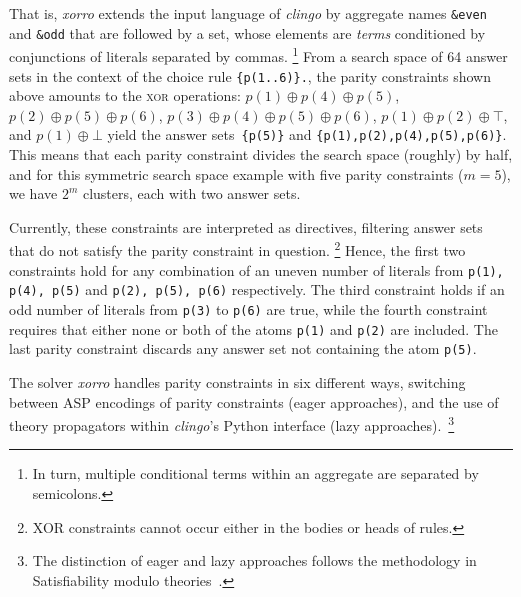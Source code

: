 \documentclass{svproc}
\newcommand{\XOR}{\textsc{xor}} %
\newcommand{\sysfont}{\textit}
\newcommand{\clingo}{\sysfont{clingo}}
\newcommand{\xorro}{\sysfont{xorro}}
\newcommand{\xor}{\oplus}
\newcommand{\set}[1]{\{#1\}}
\begin{document}
%
That is, \xorro{} extends the input language of \clingo{} by
aggregate names \texttt{\&even} and \texttt{\&odd} that are followed
by a set, whose elements are \emph{terms} conditioned by
conjunctions of literals separated by commas.%
%
\footnote{In turn, multiple conditional terms within an aggregate are
	separated by semicolons.}
%
From a search space of 64 answer sets in the context of the choice rule \texttt{\set{p(1..6)}.}, the parity constraints shown above
amounts to the \XOR{} operations:
$p(1) \xor p(4) \xor p(5)$, $p(2) \xor p(5) \xor p(6)$, $p(3) \xor p(4) \xor p(5) \xor p(6)$, $p(1) \xor p(2) \xor \top$, and $p(1) \xor \bot$
yield the answer sets~\texttt{\set{p(5)}} and \texttt{\set{p(1),p(2),p(4),p(5),p(6)}}.
This means that each parity constraint divides the search space (roughly) by half, and for this symmetric search space example with five parity constraints ($m=5$),
we have $2^m$ clusters, each with two answer sets.


Currently, these constraints are interpreted as directives,
filtering answer sets that do not satisfy the parity constraint in question.
\footnote{XOR constraints cannot occur either in the bodies or heads of rules.}
%
Hence, the first two
constraints hold for any combination of an uneven number of literals from \texttt{p(1), p(4), p(5)} and \texttt{p(2), p(5), p(6)} respectively.
The third constraint holds if an odd number of literals from \texttt{p(3)} to \texttt{p(6)} are true, while the fourth constraint requires that either none or both of
the atoms \texttt{p(1)} and \texttt{p(2)} are included.
The last parity constraint discards any answer set not containing the atom \texttt{p(5)}.

The solver \xorro{} handles parity constraints in six different ways,
switching between ASP encodings of parity constraints (eager approaches), and the use of theory propagators within \clingo{}'s Python interface (lazy approaches).~\footnote{The distinction of eager and lazy approaches follows the methodology in Satisfiability modulo theories~\cite{baseseti09a}.}
\end{document}
